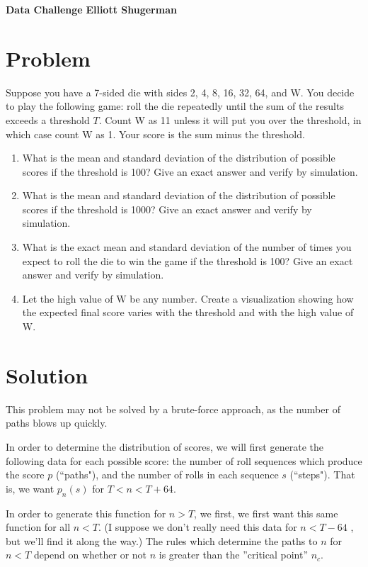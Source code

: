 \documentclass[a4paper, 11pt]{article}
\begin{document}
\large\textbf{Data Challenge } \hfill \textbf{Elliott Shugerman} \\

\section{Problem}
Suppose you have a 7-sided die with sides 2, 4, 8, 16, 32, 64, and W. You decide to play the following game: roll the die repeatedly until the sum of the results exceeds a threshold $T$. Count W as 11 unless it will put you over the threshold, in which case count W as 1. Your score is the sum minus the threshold.


\begin{enumerate}[\hspace{5mm}I.]
	\item What is the mean and standard deviation of the distribution of possible scores if the threshold is 100? Give an exact answer and verify by simulation.
	\item What is the mean and standard deviation of the distribution of possible scores if the threshold is 1000? Give an exact answer and verify by simulation.
	\item What is the exact mean and standard deviation of the number of times you expect to roll the die to win the game if the threshold is 100? Give an exact answer and verify by simulation.
	\item Let the high value of W be any number. Create a visualization showing how the expected final score varies with the threshold and with the high value of W.

\end{enumerate}
 
\section{Solution}
This problem may not be solved by a brute-force approach, as the number of paths blows up quickly. 

In order to determine the distribution of scores, we will first generate the following data for each possible score: the number of roll sequences which produce the score $p$ (``paths"), and the number of rolls in each sequence $s$ (``steps"). That is, we want $p_n(s)$ for $T < n < T + 64$. 

In order to generate this function for $n > T$, we first, we first want this same function for all $n < T$. (I suppose we don't really need this data for $n < T - 64$ , but we'll find it along the way.) The rules which determine the paths to $n$ for $n < T$ depend on whether or not $n$ is greater than the ''critical point'' $n_c$.
\end{document}
